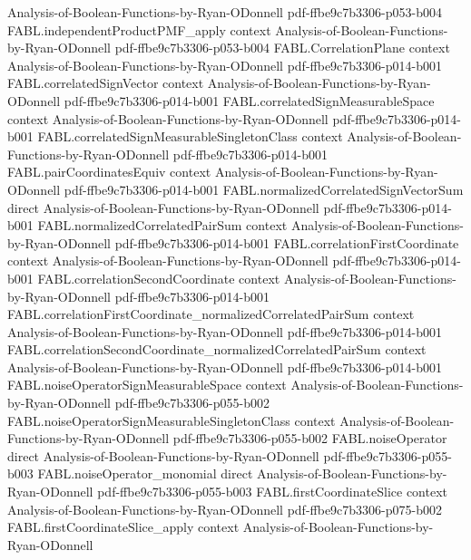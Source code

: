 \begin{theorem}
  {Analysis-of-Boolean-Functions-by-Ryan-ODonnell}
  {pdf-ffbe9c7b3306-p053-b004}
\proofstep
  {FABL.independentProductPMF_apply}
  {context}
  {Analysis-of-Boolean-Functions-by-Ryan-ODonnell}
  {pdf-ffbe9c7b3306-p053-b004}
\proofstep
  {FABL.CorrelationPlane}
  {context}
  {Analysis-of-Boolean-Functions-by-Ryan-ODonnell}
  {pdf-ffbe9c7b3306-p014-b001}
\proofstep
  {FABL.correlatedSignVector}
  {context}
  {Analysis-of-Boolean-Functions-by-Ryan-ODonnell}
  {pdf-ffbe9c7b3306-p014-b001}
\proofstep
  {FABL.correlatedSignMeasurableSpace}
  {context}
  {Analysis-of-Boolean-Functions-by-Ryan-ODonnell}
  {pdf-ffbe9c7b3306-p014-b001}
\proofstep
  {FABL.correlatedSignMeasurableSingletonClass}
  {context}
  {Analysis-of-Boolean-Functions-by-Ryan-ODonnell}
  {pdf-ffbe9c7b3306-p014-b001}
\proofstep
  {FABL.pairCoordinatesEquiv}
  {context}
  {Analysis-of-Boolean-Functions-by-Ryan-ODonnell}
  {pdf-ffbe9c7b3306-p014-b001}
\proofstep
  {FABL.normalizedCorrelatedSignVectorSum}
  {direct}
  {Analysis-of-Boolean-Functions-by-Ryan-ODonnell}
  {pdf-ffbe9c7b3306-p014-b001}
\proofstep
  {FABL.normalizedCorrelatedPairSum}
  {context}
  {Analysis-of-Boolean-Functions-by-Ryan-ODonnell}
  {pdf-ffbe9c7b3306-p014-b001}
\proofstep
  {FABL.correlationFirstCoordinate}
  {context}
  {Analysis-of-Boolean-Functions-by-Ryan-ODonnell}
  {pdf-ffbe9c7b3306-p014-b001}
\proofstep
  {FABL.correlationSecondCoordinate}
  {context}
  {Analysis-of-Boolean-Functions-by-Ryan-ODonnell}
  {pdf-ffbe9c7b3306-p014-b001}
\proofstep
  {FABL.correlationFirstCoordinate_normalizedCorrelatedPairSum}
  {context}
  {Analysis-of-Boolean-Functions-by-Ryan-ODonnell}
  {pdf-ffbe9c7b3306-p014-b001}
\proofstep
  {FABL.correlationSecondCoordinate_normalizedCorrelatedPairSum}
  {context}
  {Analysis-of-Boolean-Functions-by-Ryan-ODonnell}
  {pdf-ffbe9c7b3306-p014-b001}
\proofstep
  {FABL.noiseOperatorSignMeasurableSpace}
  {context}
  {Analysis-of-Boolean-Functions-by-Ryan-ODonnell}
  {pdf-ffbe9c7b3306-p055-b002}
\proofstep
  {FABL.noiseOperatorSignMeasurableSingletonClass}
  {context}
  {Analysis-of-Boolean-Functions-by-Ryan-ODonnell}
  {pdf-ffbe9c7b3306-p055-b002}
\proofstep
  {FABL.noiseOperator}
  {direct}
  {Analysis-of-Boolean-Functions-by-Ryan-ODonnell}
  {pdf-ffbe9c7b3306-p055-b003}
\proofstep
  {FABL.noiseOperator_monomial}
  {direct}
  {Analysis-of-Boolean-Functions-by-Ryan-ODonnell}
  {pdf-ffbe9c7b3306-p055-b003}
\proofstep
  {FABL.firstCoordinateSlice}
  {context}
  {Analysis-of-Boolean-Functions-by-Ryan-ODonnell}
  {pdf-ffbe9c7b3306-p075-b002}
\proofstep
  {FABL.firstCoordinateSlice_apply}
  {context}
  {Analysis-of-Boolean-Functions-by-Ryan-ODonnell}

\end{theorem}
